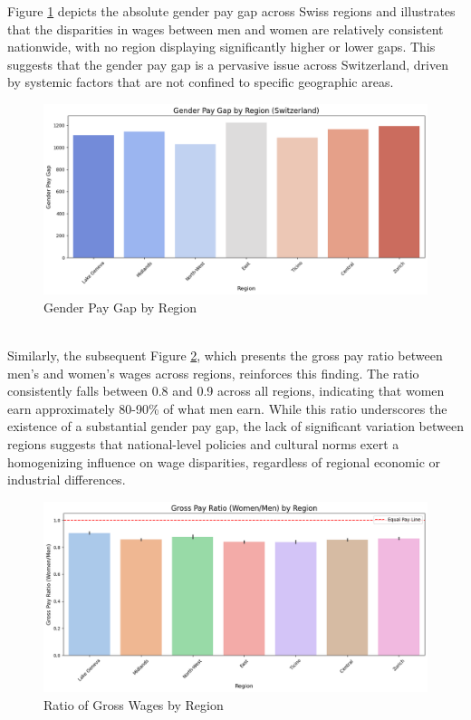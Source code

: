 \documentclass{article}
\begin{document}
Figure \ref{fig:gap_regions} depicts the absolute gender pay gap across Swiss regions and illustrates that the disparities in wages between men and women are relatively consistent nationwide, with no region displaying significantly higher or lower gaps. This suggests that the gender pay gap is a pervasive issue across Switzerland, driven by systemic factors that are not confined to specific geographic areas.\\

\begin{figure}[h]
    \centering
    \includegraphics[width=0.7\linewidth]{Figures/Gross_Pay_Gap_Region.png}
    \caption{Gender Pay Gap by Region}
    \label{fig:gap_regions}
\end{figure}
\\
Similarly, the subsequent Figure \ref{fig:ratio_region}, which presents the gross pay ratio between men’s and women’s wages across regions, reinforces this finding. The ratio consistently falls between 0.8 and 0.9 across all regions, indicating that women earn approximately 80-90\% of what men earn. While this ratio underscores the existence of a substantial gender pay gap, the lack of significant variation between regions suggests that national-level policies and cultural norms exert a homogenizing influence on wage disparities, regardless of regional economic or industrial differences.\\
\begin{figure} 
    \centering
    \includegraphics[width=0.7\linewidth]{Figures/Gross_Ratio_Region.png}
    \caption{Ratio of Gross Wages by Region}
    \label{fig:ratio_region}
\end{figure}
\\
\end{document}

